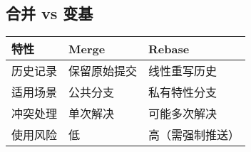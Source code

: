 \subsection{合并 vs 变基}
\begin{center}
\begin{tabular}{@{}lll@{}}
    \toprule
    \textbf{特性} & \textbf{Merge} & \textbf{Rebase} \\
    \midrule
    历史记录 & 保留原始提交 & 线性重写历史 \\
    适用场景 & 公共分支 & 私有特性分支 \\
    冲突处理 & 单次解决 & 可能多次解决 \\
    使用风险 & 低 & 高（需强制推送） \\
    \bottomrule
\end{tabular}
\end{center}